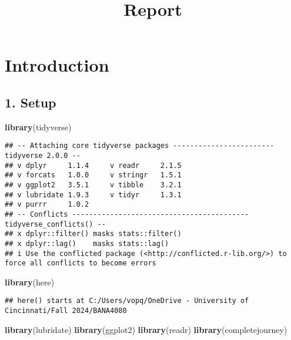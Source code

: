 \documentclass[
]{article}
\title{Report}
\author{}
\date{\vspace{-2.5em}}
\newenvironment{Shaded}{\begin{snugshade}}{\end{snugshade}}
\newcommand{\FunctionTok}[1]{\textcolor[rgb]{0.13,0.29,0.53}{\textbf{#1}}}
\newcommand{\NormalTok}[1]{#1}
\begin{document}
\maketitle

\hypertarget{introduction}{%
\section{Introduction}\label{introduction}}

\hypertarget{setup}{%
\subsection{1. Setup}\label{setup}}

\begin{Shaded}
\begin{Highlighting}[]
\FunctionTok{library}\NormalTok{(tidyverse)}
\end{Highlighting}
\end{Shaded}

\begin{verbatim}
## -- Attaching core tidyverse packages ------------------------ tidyverse 2.0.0 --
## v dplyr     1.1.4     v readr     2.1.5
## v forcats   1.0.0     v stringr   1.5.1
## v ggplot2   3.5.1     v tibble    3.2.1
## v lubridate 1.9.3     v tidyr     1.3.1
## v purrr     1.0.2     
## -- Conflicts ------------------------------------------ tidyverse_conflicts() --
## x dplyr::filter() masks stats::filter()
## x dplyr::lag()    masks stats::lag()
## i Use the conflicted package (<http://conflicted.r-lib.org/>) to force all conflicts to become errors
\end{verbatim}

\begin{Shaded}
\begin{Highlighting}[]
\FunctionTok{library}\NormalTok{(here)}
\end{Highlighting}
\end{Shaded}

\begin{verbatim}
## here() starts at C:/Users/vopq/OneDrive - University of Cincinnati/Fall 2024/BANA4080
\end{verbatim}

\begin{Shaded}
\begin{Highlighting}[]
\FunctionTok{library}\NormalTok{(lubridate)}
\FunctionTok{library}\NormalTok{(ggplot2)}
\FunctionTok{library}\NormalTok{(readr)}
\FunctionTok{library}\NormalTok{(completejourney)}
\end{Highlighting}
\end{Shaded}
\end{document}
